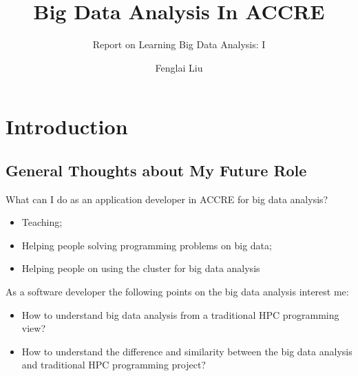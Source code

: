 \documentclass[notheorems, aspectratio=54]{beamer}
\title[Big Data Analysis In ACCRE]{Big Data Analysis In ACCRE}
\subtitle{Report on Learning Big Data Analysis: I}
\author{Fenglai Liu}
\institute[ACCRE]{fenglai@accre.vanderbilt.edu}
\begin{document}
\begin{frame}
    \titlepage
\end{frame}

\section{Introduction}
\subsection{General Thoughts about My Future Role}
\begin{frame}

\begin{block}{What can I do as an application developer in ACCRE for big data analysis?}
\begin{itemize}
 \item Teaching;
 \item Helping people solving programming problems on big data;
 \item Helping people on using the cluster for big data analysis
\end{itemize}
\end{block}

 As a software developer the following points on the big data analysis interest me:
\begin{itemize}
 \item How to understand big data analysis from a traditional HPC programming view?
 \item How to understand the difference and similarity between the big data analysis and 
 traditional HPC programming project?
\end{itemize}

\end{frame}

\end{document}
